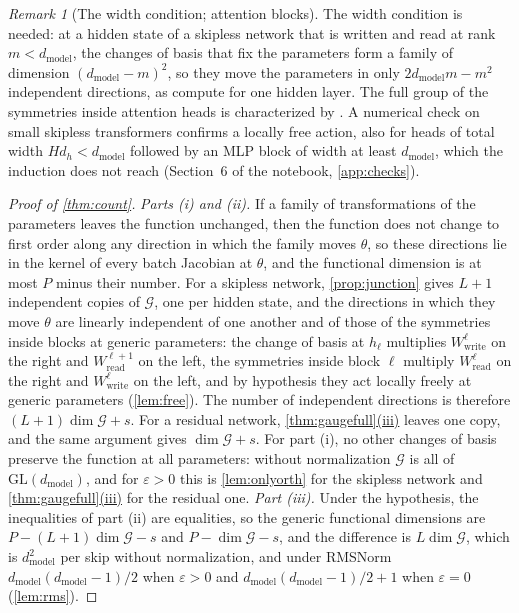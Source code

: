 \documentclass[10pt]{article}
\theoremstyle{definition}
\theoremstyle{remark}
\newtheorem{remark}[theorem]{Remark}
\newcommand{\Wread}{W_{\mathrm{read}}}
\newcommand{\Wwrite}{W_{\mathrm{write}}}
\newcommand{\dm}{d_{\mathrm{model}}}
\newcommand{\GL}{\mathrm{GL}}
\newcommand{\G}{\mathcal{G}}
\DeclareRobustCommand{\cpref}[2]{\hyperref[#1:#2]{\cref*{#1}(#2)}}
\begin{document}
\begin{remark}[The width condition; attention blocks]\label{rem:attnfree}
The width condition is needed: at a hidden state of a skipless network that is written and read at rank $m < \dm$, the changes of basis that fix the parameters form a family of dimension $(\dm-m)^2$, so they move the parameters in only $2\dm m - m^2$ independent directions, as \citet[Proposition~C.3]{zhao2023symmetries} compute for one hidden layer. The full group of the symmetries inside attention heads is characterized by \citet{wang2025gauge}. A numerical check on small skipless transformers confirms a locally free action, also for heads of total width $Hd_h < \dm$ followed by an MLP block of width at least $\dm$, which the induction does not reach (Section~6 of the notebook, \cref{app:checks}).
\end{remark}

\begin{proof}[Proof of \cref{thm:count}]
\emph{Parts (i) and (ii).} If a family of transformations of the parameters leaves the function unchanged, then the function does not change to first order along any direction in which the family moves $\theta$, so these directions lie in the kernel of every batch Jacobian at $\theta$, and the functional dimension is at most $P$ minus their number. For a skipless network, \cref{prop:junction} gives $L+1$ independent copies of $\G$, one per hidden state, and the directions in which they move $\theta$ are linearly independent of one another and of those of the symmetries inside blocks at generic parameters: the change of basis at $h_{\ell}$ multiplies $\Wwrite^{\ell}$ on the right and $\Wread^{\ell+1}$ on the left, the symmetries inside block $\ell$ multiply $\Wread^{\ell}$ on the right and $\Wwrite^{\ell}$ on the left, and by hypothesis they act locally freely at generic parameters (\cref{lem:free}). The number of independent directions is therefore $(L+1)\dim\G + s$. For a residual network, \cpref{thm:gaugefull}{iii} leaves one copy, and the same argument gives $\dim\G + s$. For part (i), no other changes of basis preserve the function at all parameters: without normalization $\G$ is all of $\GL(\dm)$, and for $\varepsilon > 0$ this is \cref{lem:onlyorth} for the skipless network and \cpref{thm:gaugefull}{iii} for the residual one.
\emph{Part (iii).} Under the hypothesis, the inequalities of part (ii) are equalities, so the generic functional dimensions are $P - (L+1)\dim\G - s$ and $P - \dim\G - s$, and the difference is $L\dim\G$, which is $\dm^2$ per skip without normalization, and under RMSNorm $\dm(\dm-1)/2$ when $\varepsilon > 0$ and $\dm(\dm-1)/2 + 1$ when $\varepsilon = 0$ (\cref{lem:rms}).
\end{proof}
\end{document}

